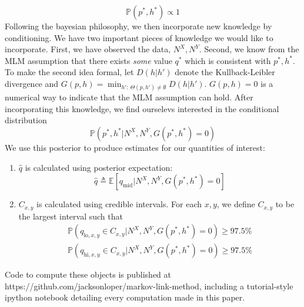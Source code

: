 \[
\mathbb{P}(p^*,h^*) \propto 1
\]
Following the bayesian philosophy, we then incorporate new knowledge by conditioning.  We have two important pieces of knowledge we would like to incorporate.  First, we have observed the data, $N^X,N^Y$.  Second, we know from the MLM assumption that there exists \emph{some} value $q^*$ which is consistent with $p^*,h^*$.   To make the second idea formal, let $D(h|h')$ denote the Kullback-Leibler divergence and $G(p,h) = \min_{h':\ \Theta(p,h')\neq \emptyset} D(h|h')$.  $G(p,h)=0$ is a numerical way to indicate that the MLM assumption can hold.  After incorporating this knowledge, we find ourselevs interested in the conditional distribution
\[
\mathbb{P}\left(p^*,h^* | N^X,N^Y,G(p^*,h^*)=0\right)
\]
We use this posterior to produce estimates for our quantities of interest:
\begin{enumerate}
    \item $\hat q$ is calculated using posterior expectation:
    \[
    \hat q \triangleq \mathbb{E}\left[q_{\mathrm{mid}} | N^X,N^Y,G(p^*,h^*)=0\right]
    \]
    \item $C_{x,y}$ is calculated using credible intervals.  For each $x,y$, we define $C_{x,y}$ to be the largest interval such that 
    \begin{align*}
    \mathbb{P}\left(q_{\mathrm{lo},x,y} \in C_{x,y} | N^X,N^Y,G(p^*,h^*)=0\right)\geq 97.5\% \\
    \mathbb{P}\left(q_{\mathrm{hi},x,y} \in C_{x,y} | N^X,N^Y,G(p^*,h^*)=0\right)\geq 97.5\% 
    \end{align*}
\end{enumerate}
Code to compute these objects is published at https://github.com/jacksonloper/markov-link-method, including a tutorial-style ipython notebook detailing every computation made in this paper.


